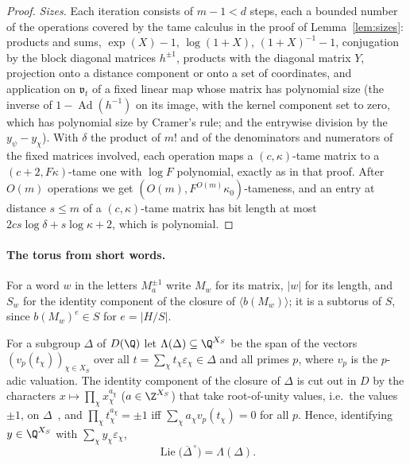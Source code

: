\begin{proof}
\emph{Sizes.} Each iteration consists of $m-1<d$ steps, each a bounded number of the operations
covered by the tame calculus in the proof of Lemma~\ref{lem:sizes}: products and sums,
$\exp(X)-1$, $\log(1+X)$, $(1+X)^{-1}-1$, conjugation by the block diagonal matrices $h^{\pm1}$, products
with the diagonal matrix $Y$, projection onto a distance component or onto a set of coordinates, and
application on $\mathfrak v_t$ of a fixed linear map whose matrix has polynomial size (the inverse of
$1-\operatorname{Ad}(h^{-1})$ on its image, with the kernel component set to zero, which has polynomial size by
Cramer's rule; and the entrywise division by the $y_\psi-y_\chi$). With $\delta$ the product of $m!$
and of the denominators and numerators of the fixed matrices involved, each operation maps a
$(c,\kappa)$-tame matrix to a $(c+2,F\kappa)$-tame one with $\log F$ polynomial, exactly as in that
proof. After $O(m)$ operations we get $(O(m),F^{O(m)}\kappa_0)$-tameness, and an entry at distance
$s\le m$ of a $(c,\kappa)$-tame matrix has bit length at most $2cs\log\delta+s\log\kappa+2$, which is
polynomial.
\end{proof}

\paragraph{The torus from short words.} For a word $w$ in the letters $M_a^{\pm1}$ write $M_w$ for its
matrix, $|w|$ for its length, and $S_w$ for the identity component of the closure of
$\langle b(M_w)\rangle$; it is a subtorus of $S$, since $b(M_w)^e\in S$ for $e=|H/S|$.

For a subgroup $\Delta$ of $D(\Q)$ let $\Lambda(\Delta)\subseteq\Q^{X_S}$ be the span of the vectors
$(v_p(t_\chi))_{\chi\in X_S}$ over all $t=\sum_\chi t_\chi\varepsilon_\chi\in\Delta$ and all primes $p$,
where $v_p$ is the $p$-adic valuation. The identity component of the closure of $\Delta$ is cut out in
$D$ by the characters $x\mapsto\prod_\chi x_\chi^{a_\chi}$ ($a\in\Z^{X_S}$) that take root-of-unity
values, i.e.\ the values $\pm1$, on $\Delta$~\cite[8.2, 8.12]{Bor91}, and $\prod_\chi t_\chi^{a_\chi}=\pm1$
iff $\sum_\chi a_\chi v_p(t_\chi)=0$ for all $p$. Hence, identifying $y\in\Q^{X_S}$ with
$\sum_\chi y_\chi\varepsilon_\chi$,
\begin{equation}\label{eq:lietorus}
\operatorname{Lie}\bigl(\overline\Delta^{\,\circ}\bigr)=\Lambda(\Delta).
\end{equation}


